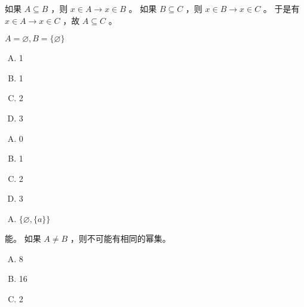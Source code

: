 {{        %
        \begin{practices}
            如果 $A \subseteq B$ ，则 $x \in A \rightarrow x \in B$ 。
            如果 $B \subseteq C$ ，则 $x \in B \rightarrow x \in C$ 。
            于是有 $x \in A \rightarrow x \in C$ ，故 $A \subseteq C$ 。
        \end{practices}

        \begin{practices}
            $A = \varnothing, B = \{\varnothing\}$
        \end{practices}

        \begin{practices}
            \begin{enumerate}[A.]
                \item 1
                \item 1
                \item 2
                \item 3
            \end{enumerate}
        \end{practices}

        \begin{practices}
            \begin{enumerate}[A.]
                \item 0
                \item 1
                \item 2
                \item 3
            \end{enumerate}
        \end{practices}

        \begin{practices}
            \begin{enumerate}[A.]
                \item $\{\varnothing, \{a\}\}$
            \end{enumerate}
        \end{practices}

        \begin{practices}
            能。
            如果 $A \neq B$ ，则不可能有相同的幂集。
        \end{practices}

        \begin{practices}
            \begin{enumerate}[A.]
                \item 8
                \item 16
                \item 2
            \end{enumerate}
        \end{practices}

}}
